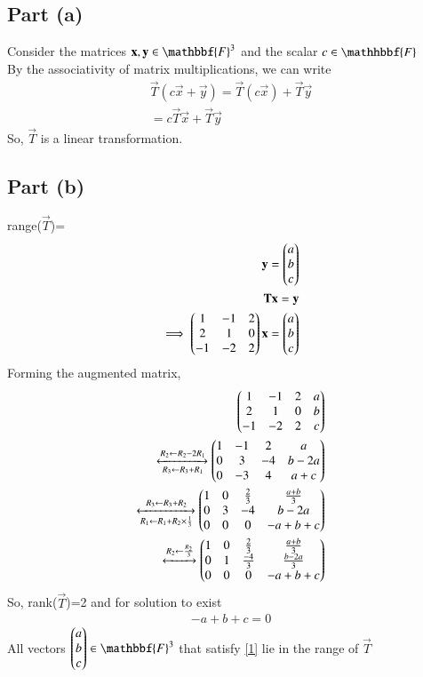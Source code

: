 \documentclass[journal,12pt,twocolumn]{IEEEtran}
\begin{document}
\subsection{Part (a)}
Consider the matrices $\vec{x},\vec{y} \in \mathbbf{F}^3$ and the scalar $c \in \mathhbbf{F}$\\
By the associativity of matrix multiplications, we can write
\begin{align}
    \vec{T}(c\vec{x}+\vec{y})=\vec{T}(c\vec{x})+\vec{T}\vec{y}\\
    =c\vec{T}\vec{x}+\vec{T}\vec{y}
\end{align}
So, $\vec{T}$ is a linear transformation.
\subsection{Part (b)}
range($\vec{T}$)=
\begin{align}
    \mathbf{y}=\begin{pmatrix}a\\b\\c\end{pmatrix}\\
    \mathbf{T}\mathbf{x}=\mathbf{y}\\
    \implies \begin{pmatrix}1&-1&2\\2&1&0\\-1&-2&2\end{pmatrix}\mathbf{x}=\begin{pmatrix}a\\b\\c\end{pmatrix}
\end{align}
Forming the augmented matrix,
\begin{align}
     \begin{pmatrix}1&-1&2&a\\2&1&0&b\\-1&-2&2&c\end{pmatrix}\\\xleftrightarrow[R_3\leftarrow R_3+R_1]{R_2\leftarrow R_2-2R_1}\begin{pmatrix}1&-1&2&a\\0&3&-4&b-2a\\0&-3&4&a+c\end{pmatrix}\\\xleftrightarrow[R_1\leftarrow R_1+R_2\times \frac{1}{3}]{R_3\leftarrow R_3+R_2}\begin{pmatrix}1&0&\frac{2}{3}&\frac{a+b}{3}\\0&3&-4&b-2a\\0&0&0&-a+b+c\end{pmatrix}\\
     \xleftrightarrow[]{R_2\leftarrow \frac{R_2}{3}}\begin{pmatrix}1&0&\frac{2}{3}&\frac{a+b}{3}\\0&1&\frac{-4}{3}&\frac{b-2a}{3}\\0&0&0&-a+b+c\end{pmatrix}
\end{align}
So, rank($\vec{T}$)=2 and for solution to exist
\begin{align}
  -a+b+c=0 \label{1} 
\end{align}
All vectors $\myvec{a\\b\\c} \in \mathbbf{F}^3$ that satisfy \eqref{1} lie in the range of $\vec{T}$
\end{document}
